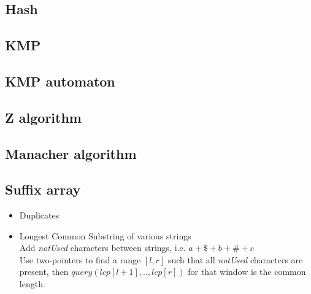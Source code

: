 
\subsection{Hash}

\subsection{KMP} 
\vspace{-15pt}

\subsection{KMP automaton}

\subsection{Z algorithm}

\subsection{Manacher algorithm}

\subsection{Suffix array}
\vspace{-5pt}
\begin{itemize}[noitemsep]
  \item Duplicates 

  \item Longest Common Substring of various strings \\
  Add \emph{notUsed} characters between strings, i.e. $a + \$ + b + \# + c$ \\ 
  Use two-pointers to find a range $[l, r]$ such that all \emph{notUsed} characters are present, then $query(lcp[l + 1],..,lcp[r])$ for that window is the common length. \\


\end{itemize}
\vspace{-15pt}

